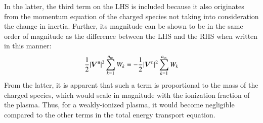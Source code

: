 \documentclass{warpdoc}
\newcommand{\nns}{{n_{\rm ns}}}
\newcommand{\ncs}{{n_{\rm cs}}}
\renewcommand{\vec}[1]{\bm{#1}}
\begin{document}
%
In the latter, the third term on the LHS is included because it also originates from the momentum equation of the charged species not taking into consideration the change in inertia. Further, its magnitude can be shown to be in the same order of magnitude as the difference between the LHS and the RHS when written in this manner:
%
\begin{equation}
\frac{1}{2}|\vec{V}^{\rm n}|^2 \sum_{k=1}^\nns W_k =
-\frac{1}{2}|\vec{V}^{\rm n}|^2 \sum_{k=1}^\ncs W_k
\end{equation}
%   
From the latter, it is apparent that such a term is proportional to the mass of the charged species, which would scale in magnitude with the ionization fraction of the plasma. Thus, for a weakly-ionized plasma, it would become negligible compared to the other terms in the total energy transport equation. 
\end{document}
